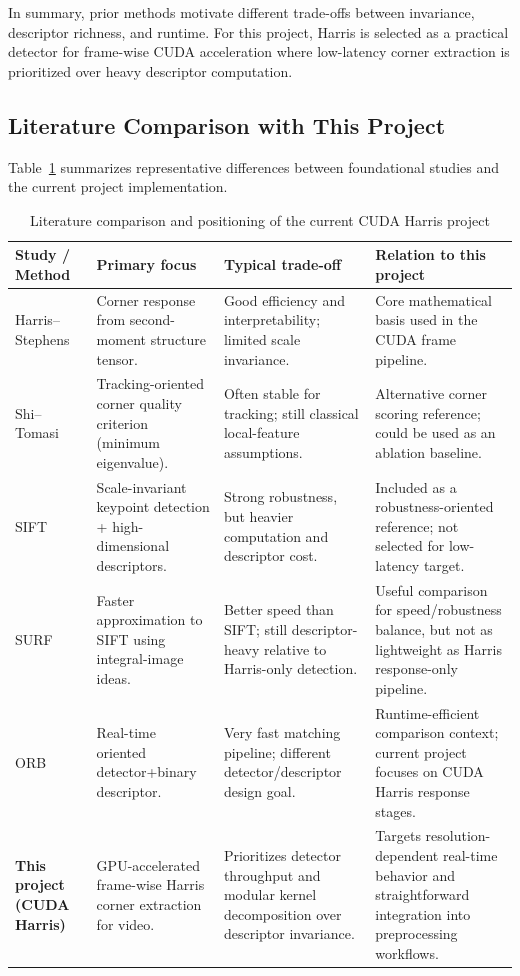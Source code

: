 \documentclass[conference]{IEEEtran}
\begin{document}
In summary, prior methods motivate different trade-offs between invariance, descriptor richness, and runtime. For this project, Harris is selected as a practical detector for frame-wise CUDA acceleration where low-latency corner extraction is prioritized over heavy descriptor computation.

\subsection{Literature Comparison with This Project}
Table~\ref{tab:lit-comparison} summarizes representative differences between foundational studies and the current project implementation.

\begin{table}[t]
\caption{Literature comparison and positioning of the current CUDA Harris project}
\label{tab:lit-comparison}
\centering
\small
\begin{tabularx}{\textwidth}{>{\raggedright\arraybackslash}p{} >{\raggedright\arraybackslash}p{} >{\raggedright\arraybackslash}p{} >{\raggedright\arraybackslash}p{}}
\toprule
\textbf{Study / Method} & \textbf{Primary focus} & \textbf{Typical trade-off} & \textbf{Relation to this project} \\
\midrule
Harris--Stephens~\cite{harris1988} & Corner response from second-moment structure tensor. & Good efficiency and interpretability; limited scale invariance. & Core mathematical basis used in the CUDA frame pipeline. \\
Shi--Tomasi~\cite{shi1994} & Tracking-oriented corner quality criterion (minimum eigenvalue). & Often stable for tracking; still classical local-feature assumptions. & Alternative corner scoring reference; could be used as an ablation baseline. \\
SIFT~\cite{lowe2004} & Scale-invariant keypoint detection + high-dimensional descriptors. & Strong robustness, but heavier computation and descriptor cost. & Included as a robustness-oriented reference; not selected for low-latency target. \\
SURF~\cite{bay2008} & Faster approximation to SIFT using integral-image ideas. & Better speed than SIFT; still descriptor-heavy relative to Harris-only detection. & Useful comparison for speed/robustness balance, but not as lightweight as Harris response-only pipeline. \\
ORB~\cite{rublee2011} & Real-time oriented detector+binary descriptor. & Very fast matching pipeline; different detector/descriptor design goal. & Runtime-efficient comparison context; current project focuses on CUDA Harris response stages. \\
\textbf{This project (CUDA Harris)} & GPU-accelerated frame-wise Harris corner extraction for video. & Prioritizes detector throughput and modular kernel decomposition over descriptor invariance. & Targets resolution-dependent real-time behavior and straightforward integration into preprocessing workflows. \\
\bottomrule
\end{tabularx}
\end{table}
\end{document}
